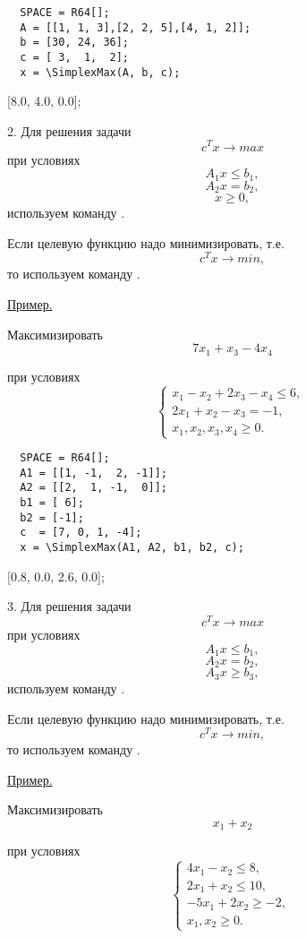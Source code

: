 \begin{verbatim}
  SPACE = R64[];
  A = [[1, 1, 3],[2, 2, 5],[4, 1, 2]];
  b = [30, 24, 36];
  c = [ 3,  1,  2];
  x = \SimplexMax(A, b, c);
\end{verbatim}


\ex{}
{[8.0, 4.0, 0.0];}

2. Для решения задачи
$$c^Tx \rightarrow max$$
при условиях
$$A_1 x \leqslant b_1,$$
$$A_2 x =         b_2,$$
$$ x \geqslant 0,$$
используем команду .

Если целевую функцию надо минимизировать, т.е. $$c^Tx \rightarrow min,$$ то используем команду .

\underline{%
Пример.%
}

 Максимизировать $$7x_1 + x_3 - 4x_4$$

при условиях
$$%
  \left\{
  \begin{array}{c} %
   x_1 - x_2 + 2x_3 - x_4 \leqslant  6,\ \\
  2x_1 + x_2 - x_3 = -1,\ \\
   x_1,  x_2,   x_3,  x_4 \geqslant  0. %
  \end{array}
  \right. %
$$

\begin{verbatim}
  SPACE = R64[];
  A1 = [[1, -1,  2, -1]];
  A2 = [[2,  1, -1,  0]];
  b1 = [ 6];
  b2 = [-1];
  c  = [7, 0, 1, -4];
  x = \SimplexMax(A1, A2, b1, b2, c);
\end{verbatim}
\ex{}
{[0.8, 0.0, 2.6, 0.0];}

3. Для решения задачи
$$c^Tx \rightarrow max$$
при условиях
$$A_1 x\leqslant b_1,$$
$$A_2 x =         b_2,$$
$$A_3 x\geqslant b_3,$$
используем команду .

Если целевую функцию надо минимизировать, т.е. $$c^Tx \rightarrow min,$$ то используем команду .

\underline{%
Пример.%
}

Максимизировать $$x_1 + x_2$$

при условиях
$$%
  \left\{
  \begin{array}{c} %
   4x_1 -  x_2 \leqslant  8,\ \\
   2x_1 +  x_2 \leqslant 10,\ \\
  -5x_1 + 2x_2 \geqslant -2,\ \\
   x_1,    x_2 \geqslant  0.%
  \end{array}
  \right. %
$$


